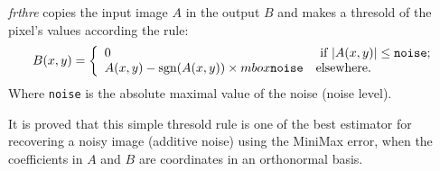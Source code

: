 {\em frthre} copies the input image $A$ in the output $B$ and makes a thresold 
of the pixel's values according the rule:
\[
B(x,y) = \left\{
\begin{array}{ll}
 0 & \mbox{ if } |A(x,y)| \leq \mbox{\tt noise}; \\
 A(x,y) - \mbox{sgn}(A(x,y)) \times mbox{\tt noise} & \mbox{elsewhere.} 
\end{array}
\right.
\]
Where \verb+noise+ is the absolute maximal value of the noise (noise level).

It is proved that this simple thresold rule is one of the best estimator
for recovering a noisy image (additive noise) using the MiniMax error, 
when the coefficients in $A$ and $B$ are coordinates in an orthonormal basis.


